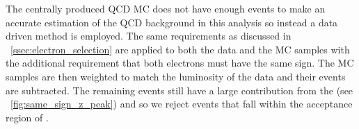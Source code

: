 The centrally produced QCD MC does not have enough events to make an accurate
estimation of the QCD background in this analysis so instead a data driven
method is employed. The same requirements as discussed in
\SEC~\ref{ssec:electron_selection} are applied to both the data and the MC
samples with the additional requirement that both electrons must have the same
sign. The MC samples are then weighted to match the luminosity of the data and
their events are subtracted. The remaining events still have a large
contribution from the \Z (see \FIG~\ref{fig:same_sign_z_peak}) and so we reject
events that fall within the \mee acceptance region of \MassRange.

